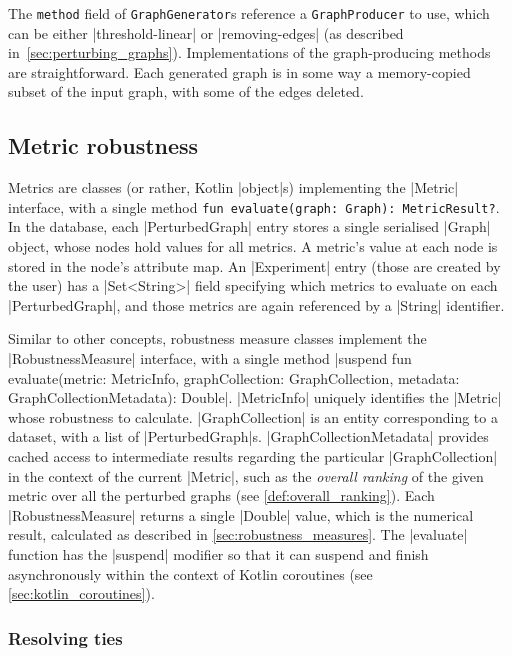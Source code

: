 The \texttt{method} field of \texttt{GraphGenerator}s reference a \texttt{GraphProducer} to use, which can be either |threshold-linear| or |removing-edges| (as described in~\autoref{sec:perturbing_graphs}).
Implementations of the graph-producing methods are straightforward.
Each generated graph is in some way a memory-copied subset of the input graph, with some of the edges deleted.

\subsection{Metric robustness}

Metrics are classes (or rather, Kotlin |object|s) implementing the |Metric| interface, with a single method \texttt{fun evaluate(graph: Graph): MetricResult?}.
In the database, each |PerturbedGraph| entry stores a single serialised |Graph| object, whose nodes hold values for all metrics.
A metric's value at each node is stored in the node's attribute map.
An |Experiment| entry (those are created by the user) has a |Set<String>| field specifying which metrics to evaluate on each |PerturbedGraph|, and those metrics are again referenced by a |String| identifier.

Similar to other concepts, robustness measure classes implement the |RobustnessMeasure| interface, with a single method |suspend fun evaluate(metric: MetricInfo, graphCollection: GraphCollection, metadata: GraphCollectionMetadata): Double|.
|MetricInfo| uniquely identifies the |Metric| whose robustness to calculate.
|GraphCollection| is an entity corresponding to a dataset, with a list of |PerturbedGraph|s.
|GraphCollectionMetadata| provides cached\footnotemark{} access to intermediate results regarding the particular |GraphCollection| in the context of the current |Metric|, such as the \textsl{overall ranking} of the given metric over all the perturbed graphs (see \autoref{def:overall_ranking}).
Each |RobustnessMeasure| returns a single |Double| value, which is the numerical result, calculated as described in \autoref{sec:robustness_measures}.
The |evaluate| function has the |suspend| modifier so that it can suspend and finish asynchronously within the context of Kotlin coroutines (see \autoref{sec:kotlin_coroutines}).

\subsubsection*{Resolving ties}


